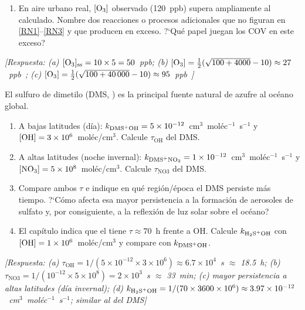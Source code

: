 \begin{bloque_ejercicios}
\begin{ejercicios}
\begin{enumerate}[label=\alph*)]
    \item En aire urbano real, $[\ce{O3}]$ observado
          (120~ppb) supera ampliamente al calculado.
          Nombre dos reacciones o procesos adicionales
          que no figuran en \ref{RN1}--\ref{RN3}
          y que producen  en exceso.
          ?`Qu\'e papel juegan los COV en este exceso?
\end{enumerate}

\textit{[Respuesta:
(a) $[\ce{O3}]_\mathrm{ss} = 10\times5 = 50$~ppb;
(b) $[\ce{O3}] = \tfrac{1}{2}(\sqrt{100+4000}-10)
    \approx 27$~ppb~\checkmark;
(c) $[\ce{O3}] = \tfrac{1}{2}(\sqrt{100+40\,000}-10)
    \approx 95$~ppb~\checkmark]}

\item El sulfuro de dimetilo (DMS, ) es la
principal fuente natural de azufre al oc\'eano global.

\begin{enumerate}[label=\alph*)]
    \item A bajas latitudes (d\'ia):
          $k_{\ce{DMS+OH}} = 5\times10^{-12}$~cm$^3$~mol\'ec$^{-1}$~s$^{-1}$
          y $[\ce{OH}] = 3\times10^6$~mol\'ec/cm$^3$.
          Calcule $\tau_\mathrm{OH}$ del DMS.

    \item A altas latitudes (noche invernal):
          $k_{\ce{DMS+NO3}} = 1\times10^{-12}$~cm$^3$~mol\'ec$^{-1}$~s$^{-1}$
          y $[\ce{NO3}] = 5\times10^8$~mol\'ec/cm$^3$.
          Calcule $\tau_\mathrm{NO3}$ del DMS.

    \item Compare ambos $\tau$ e indique en qu\'e
          regi\'on/\'epoca el DMS persiste m\'as tiempo.
          ?`C\'omo afecta esa mayor persistencia a la
          formaci\'on de aerosoles de sulfato y,
          por consiguiente, a la reflexi\'on de luz solar
          sobre el oc\'eano?

    \item El cap\'itulo indica que el  tiene
          $\tau\approx70$~h frente a OH.
          Calcule $k_{\ce{H2S+OH}}$ con
          $[\ce{OH}] = 1\times10^6$~mol\'ec/cm$^3$
          y compare con $k_{\ce{DMS+OH}}$.
\end{enumerate}

\textit{[Respuesta:
(a) $\tau_\mathrm{OH} = 1/(5\times10^{-12}
    \times3\times10^6) \approx 6.7\times10^4$~s
    $\approx$ 18.5~h;
(b) $\tau_\mathrm{NO3} = 1/(10^{-12}
    \times5\times10^8) = 2\times10^3$~s $\approx$ 33~min;
(c) mayor persistencia a altas latitudes (d\'ia invernal);
(d) $k_{\ce{H2S+OH}} = 1/(70\times3600\times10^6)
    \approx 3.97\times10^{-12}$~cm$^3$~mol\'ec$^{-1}$~s$^{-1}$;
    similar al del DMS]}


\end{ejercicios}
\end{bloque_ejercicios}
